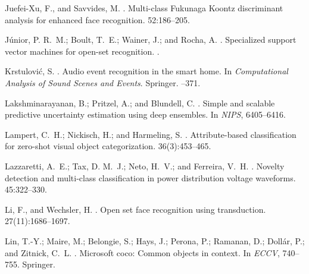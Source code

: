 \documentclass[letterpaper]{article}
\begin{document}
\begin{thebibliography}{}
Juefei-Xu, F., and Savvides, M.
.
\newblock Multi-class {Fukunaga} {Koontz} discriminant analysis for enhanced
  face recognition.
 52:186--205.

J{\'u}nior, P. R.~M.; Boult, T.~E.; Wainer, J.; and Rocha, A.
.
\newblock Specialized support vector machines for open-set recognition.
.

Krstulović, S.
.
\newblock Audio event recognition in the smart home.
\newblock In {\em Computational {Analysis} of {Sound} {Scenes} and {Events}}.
  Springer.
--371.

Lakshminarayanan, B.; Pritzel, A.; and Blundell, C.
.
\newblock Simple and scalable predictive uncertainty estimation using deep
  ensembles.
\newblock In {\em NIPS},  6405--6416.

Lampert, C.~H.; Nickisch, H.; and Harmeling, S.
.
\newblock Attribute-based classification for zero-shot visual object
  categorization.
  36(3):453--465.

Lazzaretti, A.~E.; Tax, D. M.~J.; Neto, H.~V.; and Ferreira, V.~H.
.
\newblock Novelty detection and multi-class classification in power
  distribution voltage waveforms.
 45:322--330.

Li, F., and Wechsler, H.
.
\newblock Open set face recognition using transduction.
  27(11):1686--1697.

Lin, T.-Y.; Maire, M.; Belongie, S.; Hays, J.; Perona, P.; Ramanan, D.;
  Doll{\'a}r, P.; and Zitnick, C.~L.
.
\newblock Microsoft coco: Common objects in context.
\newblock In {\em ECCV},  740--755.
\newblock Springer.


\end{thebibliography}
\end{document}
